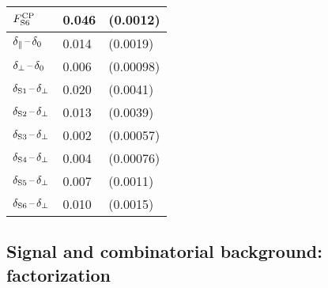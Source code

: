 \begin{table}[htbp]
\begin{tabular}{lll}
    $\FSAv[6]$      &  0.046  &  (0.0012)                         \\
    \hline
    $\delparzero$   &  0.014  &  (0.0019)                         \\
    $\delperpzero$  &  0.006  &  (0.00098)                        \\
    $\delSperp[1]$  &  0.020  &  (0.0041)                         \\
    $\delSperp[2]$  &  0.013  &  (0.0039)                         \\
    $\delSperp[3]$  &  0.002  &  (0.00057)                        \\
    $\delSperp[4]$  &  0.004  &  (0.00076)                        \\
    $\delSperp[5]$  &  0.007  &  (0.0011)                         \\
    $\delSperp[6]$  &  0.010  &  (0.0015)                         \\
    \hline
  \end{tabular}
\end{table}


\subsection{Signal and combinatorial background: factorization}
\label{subsec:syst_mass_factor}

